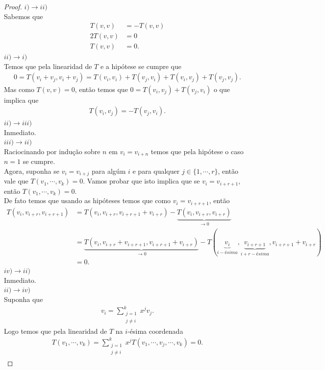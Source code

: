 \begin{proof} 
  $i)\to ii)$\\
  Sabemos que
  \begin{align*}
    T(v,v)&=-T(v,v)\\
    2T(v,v)&=0\\
    T(v,v)&=0.
  \end{align*}
  $ii)\to i)$\\
  Temos que pela linearidad de $T$ e a hipótese se cumpre que 
  \begin{align*}
    0=T(v_i+v_j,v_i+v_j)=T(v_i,v_i)+T(v_j,v_i)+T(v_i,v_j)+T(v_j,v_j).
  \end{align*}
  Mas como $T(v,v)=0$, então temos que $0=T(v_i,v_j)+T(v_j,v_i)$ o que implica que
  \begin{align*}
    T(v_i,v_j)=-T(v_j,v_i).
  \end{align*}
  $ii)\to iii)$\\
  Inmediato.\\
  $iii)\to ii)$\\
  Raciocinando por indução sobre $n$ em $v_i=v_{i+n}$ temos que pela hipótese o caso $n=1$ se cumpre.\\
  Agora, suponha se $v_i=v_{i+j}$ para algúm $i$ e para qualquer $j\in\{1,\cdots,r\}$, então vale que $T(v_1,\cdots,v_k)=0$. Vamos probar que isto implica que se $v_i=v_{i+r+1}$, então $T(v_1,\cdots,v_k)=0$.\\
  De fato temos que usando as hipóteses temos que como $v_i=v_{i+r+1}$, então
  \begin{align*}
    T(v_i,v_{i+r},v_{i+r+1})&=T(v_i,v_{i+r},v_{i+r+1}+v_{i+r})-\underbrace{T(v_i,v_{i+r},v_{i+r})}_{\to 0}\\
    &=\underbrace{T(v_i,v_{i+r}+v_{i+r+1},v_{i+r+1}+v_{i+r})}_{\to 0}-T(\underbrace{v_i}_{i-ésima},\underbrace{v_{i+r+1}}_{i+r-ésima},v_{i+r+1}+v_{i+r})\\
    &=0.
  \end{align*}
  $iv)\to ii)$\\
  Inmediato.\\
  $ii)\to iv)$\\
  Suponha que
  \begin{align*}
    v_i=\sum_{\substack{j=1\\j\neq i}}^{k}x^{j}v_j.
  \end{align*}
  Logo temos que pela linearidad de $T$ na $i$-ésima coordenada 
  \begin{align*}
    T(v_1,\cdots,v_k)=\sum_{\substack{j=1\\j\neq i}}^{k}x^{j}T(v_1,\cdots,v_j,\cdots,v_k)=0.
  \end{align*}
\end{proof}
